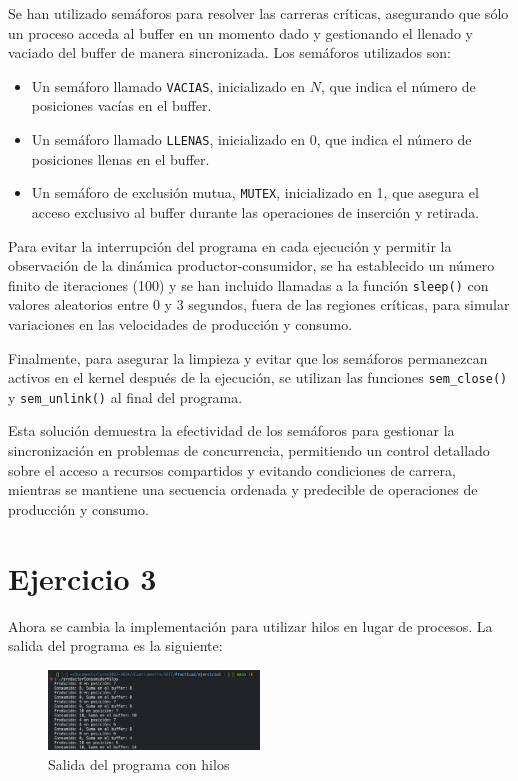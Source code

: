 \documentclass[twocolumn]{article}
\begin{document}
Se han utilizado semáforos para resolver las carreras críticas, asegurando que sólo un proceso acceda al buffer en un momento dado y gestionando el llenado y vaciado del buffer de manera sincronizada. Los semáforos utilizados son:

\begin{itemize}
    \item Un semáforo llamado \texttt{VACIAS}, inicializado en $N$, que indica el número de posiciones vacías en el buffer.
    \item Un semáforo llamado \texttt{LLENAS}, inicializado en 0, que indica el número de posiciones llenas en el buffer.
    \item Un semáforo de exclusión mutua, \texttt{MUTEX}, inicializado en 1, que asegura el acceso exclusivo al buffer durante las operaciones de inserción y retirada.
\end{itemize}

Para evitar la interrupción del programa en cada ejecución y permitir la observación de la dinámica productor-consumidor, se ha establecido un número finito de iteraciones (100) y se han incluido llamadas a la función \texttt{sleep()} con valores aleatorios entre 0 y 3 segundos, fuera de las regiones críticas, para simular variaciones en las velocidades de producción y consumo.

Finalmente, para asegurar la limpieza y evitar que los semáforos permanezcan activos en el kernel después de la ejecución, se utilizan las funciones \texttt{sem\_close()} y \texttt{sem\_unlink()} al final del programa.

Esta solución demuestra la efectividad de los semáforos para gestionar la sincronización en problemas de concurrencia, permitiendo un control detallado sobre el acceso a recursos compartidos y evitando condiciones de carrera, mientras se mantiene una secuencia ordenada y predecible de operaciones de producción y consumo.

\section{Ejercicio 3}

Ahora se cambia la implementación para utilizar hilos en lugar de procesos. La salida del programa es la siguiente:

\begin{figure}[H]
    \centering
    \includegraphics[width=0.5\textwidth]{ejercicio3/salidaHilos.jpg}
    \caption{Salida del programa con hilos} 
    \label{fig:my_label}
\end{figure}
\end{document}
